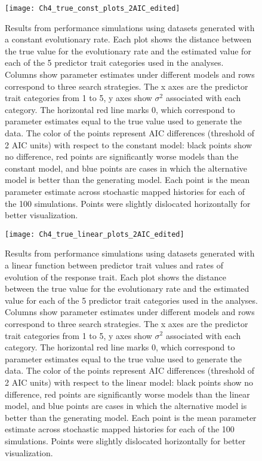 \begin{figure}[h]
	\centering
	\texttt{[image: Ch4\_true\_const\_plots\_2AIC\_edited]}
	\caption[Results from performance simulations using datasets generated with a constant evolutionary rate.]{Results from performance simulations using datasets generated with a constant evolutionary rate. Each plot shows the distance between the true value for the evolutionary rate and the estimated value for each of the 5 predictor trait categories used in the analyses. Columns show parameter estimates under different models and rows correspond to three search strategies. The x axes are the predictor trait categories from 1 to 5, y axes show $\sigma^{2}$ associated with each category. The horizontal red line marks 0, which correspond to parameter estimates equal to the true value used to generate the data. The color of the points represent AIC differences (threshold of 2 AIC units) with respect to the constant model: black points show no difference, red points are significantly worse models than the constant model, and blue points are cases in which the alternative model is better than the generating model. Each point is the mean parameter estimate across stochastic mapped histories for each of the 100 simulations. Points were slightly dislocated horizontally for better visualization.}
	\label{fig:chart_const}
\end{figure}

\begin{figure}[h]
	\centering
	\texttt{[image: Ch4\_true\_linear\_plots\_2AIC\_edited]}
	\caption[Results from performance simulations using datasets generated with a linear function between predictor trait values and rates of evolution of the response trait.]{Results from performance simulations using datasets generated with a linear function between predictor trait values and rates of evolution of the response trait. Each plot shows the distance between the true value for the evolutionary rate and the estimated value for each of the 5 predictor trait categories used in the analyses. Columns show parameter estimates under different models and rows correspond to three search strategies. The x axes are the predictor trait categories from 1 to 5, y axes show $\sigma^{2}$ associated with each category. The horizontal red line marks 0, which correspond to parameter estimates equal to the true value used to generate the data. The color of the points represent AIC differences (threshold of 2 AIC units) with respect to the linear model: black points show no difference, red points are significantly worse models than the linear model, and blue points are cases in which the alternative model is better than the generating model. Each point is the mean parameter estimate across stochastic mapped histories for each of the 100 simulations. Points were slightly dislocated horizontally for better visualization.}
	\label{fig:chart_linear}
\end{figure}

